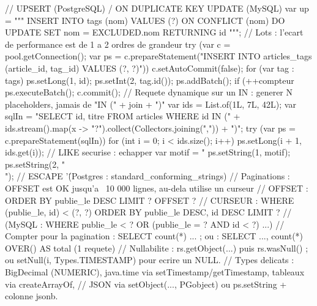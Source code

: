 \documentclass[12pt,a4paper,twoside,openright]{book}
\begin{document}
\begin{codejava}
// UPSERT (PostgreSQL) / ON DUPLICATE KEY UPDATE (MySQL)
var up = """
        INSERT INTO tags (nom) VALUES (?) ON CONFLICT (nom) DO UPDATE SET nom = EXCLUDED.nom RETURNING id
        """;
// Lots : l'ecart de performance est de 1 a 2 ordres de grandeur
try (var c = pool.getConnection(); var ps = c.prepareStatement("INSERT INTO articles_tags (article_id, tag_id) VALUES (?, ?)")) {
    c.setAutoCommit(false);
    for (var tag : tags) {
        ps.setLong(1, id); ps.setInt(2, tag.id());
        ps.addBatch();
        if (++compteur %
    }
    ps.executeBatch();
    c.commit();
}
// Requete dynamique sur un IN : generer N placeholders, jamais de "IN (" + join + ")"
var ids = List.of(1L, 7L, 42L);
var sqlIn = "SELECT id, titre FROM articles WHERE id IN (" +
        ids.stream().map(x -> "?").collect(Collectors.joining(",")) + ")";
try (var ps = c.prepareStatement(sqlIn)) {
    for (int i = 0; i < ids.size(); i++) { ps.setLong(i + 1, ids.get(i)); }
}
// LIKE securise : echapper %
var motif = "%
ps.setString(1, motif);
ps.setString(2, "\\");                       // ESCAPE '\' (Postgres : standard_conforming_strings)
// Paginations : OFFSET est OK jusqu'a ~10 000 lignes, au-dela utilise un curseur
//   OFFSET :   ORDER BY publie_le DESC LIMIT ? OFFSET ?
//   CURSEUR :  WHERE (publie_le, id) < (?, ?) ORDER BY publie_le DESC, id DESC LIMIT ?
//   (MySQL : WHERE publie_le < ? OR (publie_le = ? AND id < ?) ...)
// Compter pour la pagination : SELECT count(*) ... ; ou : SELECT ..., count(*) OVER() AS total (1 requete)
// Nullabilite : rs.getObject(...) puis rs.wasNull() ; ou setNull(i, Types.TIMESTAMP) pour ecrire un NULL.
// Types delicats : BigDecimal (NUMERIC), java.time via setTimestamp/getTimestamp, tableaux via createArrayOf,
// JSON via setObject(..., PGobject) ou ps.setString + colonne jsonb.
\end{codejava}
\end{document}
